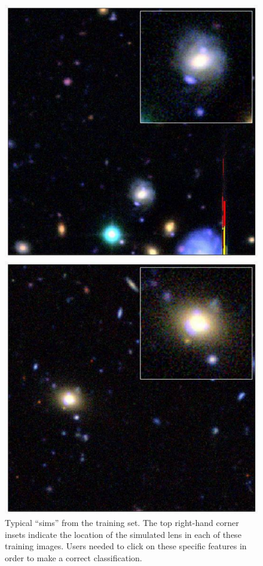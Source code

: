 \documentclass[useAMS,usenatbib,a4paper]{mn2e}
\begin{document}
\begin{figure}
\begin{minipage}[b]{0.24\linewidth}
\end{minipage} \hfill
\begin{minipage}[b]{0.24\linewidth}
\centering\includegraphics[width=\linewidth]{6.pdf}
\end{minipage} \hfill
\begin{minipage}[b]{0.24\linewidth}
\centering\includegraphics[width=\linewidth]{7.pdf}
\end{minipage} \hfill
\caption{Typical \SW ``sims'' from the \StageTwo training set.
The top right-hand corner insets indicate the
location of the simulated lens in each of these training images. Users needed to
click on these specific features in order to make a correct classification.}
\label{fig:training-gallery:sims}
\end{figure}
\end{document}
